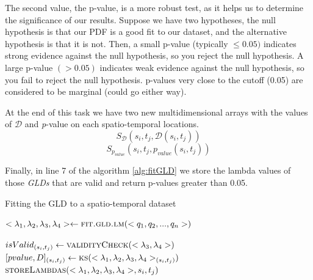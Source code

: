 The second value, the p-value, is a more robust test, as it helps us to determine the significance of our results. Suppose we have two hypotheses, the null hypothesis  is that our PDF is a good fit to our dataset, and the alternative hypothesis  is that it is not. Then, a small p-value (typically $\leq 0.05)$ indicates strong evidence against the null hypothesis, so you reject the null hypothesis. A large p-value $(> 0.05)$ indicates weak evidence against the null hypothesis, so you fail to reject the null hypothesis. p-values very close to the cutoff (0.05) are considered to be marginal (could go either way). 

At the end of this task we have two new multidimensional arrays with the values of $\mathcal{D}$ and \textit{p}-value on each spatio-temporal locations.
\begin{equation}
S_{\mathcal{D}}(s_{i},t_{j},\mathcal{D}(s_{i},t_{j}))
\end{equation}
\begin{equation}
S_{p_{value}}(s_{i},t_{j},p_{value}(s_{i},t_{j}))
\end{equation}

Finally, in line 7 of the algorithm \ref{alg:fitGLD} we store the lambda values of those \textit{GLDs} that are valid and return p-values greater than 0.05.

\begin{algorithm} 
\caption{Fitting the GLD to a spatio-temporal dataset}\label{alg:fitGLD}
\begin{algorithmic}[1] 
\State $<\lambda_{1},\lambda_{2},\lambda_{3},\lambda_{4}> \gets \Call {fit.gld.lm}{<q_1,q_2,...,q_n>}$

\State $isValid_{(s_{i},t_{j})} \gets \Call {validityCheck}{<\lambda_{3},\lambda_{4}>}$
\State $[pvalue,D]_{(s_{i},t_{j})} \gets \Call{ks}{<\lambda_{1},\lambda_{2},\lambda_{3},\lambda_{4}>_{(s_{i},t_{j})}}$
\EndIf
{}
\State $\Call{storeLambdas}{<\lambda_{1},\lambda_{2},\lambda_{3},\lambda_{4}>,s_{i},t_{j}}$
\EndIf
\EndFunction 
\end{algorithmic} 
\end{algorithm} 

